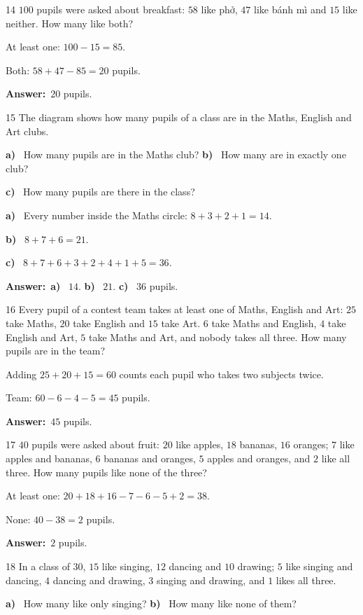 \documentclass[11pt]{article}
\newif\ifsol \solfalse
\providecommand{\AnsWord}{Đáp số}
\newcommand{\dapso}[1]{\par\textbf{\AnsWord:}\ #1}
\newcommand{\probsol}[1]{%
  \begin{lrbox}{\solmeasure}\begin{minipage}{\dimexpr\linewidth-24pt\relax}#1\end{minipage}\end{lrbox}%
  \ifsol
    \begin{solbox}#1\end{solbox}%
  \else
    \setlength{\solht}{\dimexpr\ht\solmeasure+\dp\solmeasure+0.85cm\relax}%
    \ifdim\solht<1.35cm\setlength{\solht}{1.35cm}\fi
    \begin{tcolorbox}[colback=white,colframe=Line,boxrule=0.8pt,arc=5pt,
      left=8pt,right=8pt,top=4pt,bottom=4pt,height=\solht]{\footnotesize\color{Slate}\itshape\WorkWord}\end{tcolorbox}%
  \fi}
\newcommand{\pa}[1]{\textbf{#1)}\ }
\newcommand{\gap}{\vspace{0.3cm}}
\def\WorkWord{Your work:}
\def\AnsWord{Answer}
\begin{document}
\gap
\begin{probbox}{14}{\relax}
$100$ pupils were asked about breakfast: $58$ like phở, $47$ like bánh mì and $15$ like neither. How many like both?
\end{probbox}
\probsol{
At least one: $100-15=85$.\par Both: $58+47-85=20$ pupils.
\dapso{$20$ pupils.}}
\gap
\needspace{7.5cm}
\begin{probbox}{15}{\relax}
The diagram shows how many pupils of a class are in the Maths, English and Art clubs.
\begin{center}
\end{center}
\pa{a} How many pupils are in the Maths club? \quad \pa{b} How many are in exactly one club?\par
\pa{c} How many pupils are there in the class?
\end{probbox}
\probsol{
\pa{a} Every number inside the Maths circle: $8+3+2+1=14$.\par
\pa{b} $8+7+6=21$.\par
\pa{c} $8+7+6+3+2+4+1+5=36$.
\dapso{\pa{a} $14$. \pa{b} $21$. \pa{c} $36$ pupils.}}
\gap
\begin{probbox}{16}{\relax}
Every pupil of a contest team takes at least one of Maths, English and Art: $25$ take Maths, $20$ take English and $15$ take Art. $6$ take Maths and English, $4$ take English and Art, $5$ take Maths and Art, and nobody takes all three. How many pupils are in the team?
\end{probbox}
\probsol{
Adding $25+20+15=60$ counts each pupil who takes two subjects twice.\par
Team: $60-6-4-5=45$ pupils.
\dapso{$45$ pupils.}}
\gap
\begin{probbox}{17}{\relax}
$40$ pupils were asked about fruit: $20$ like apples, $18$ bananas, $16$ oranges; $7$ like apples and bananas, $6$ bananas and oranges, $5$ apples and oranges, and $2$ like all three. How many pupils like none of the three?
\end{probbox}
\probsol{
At least one: $20+18+16-7-6-5+2=38$.\par None: $40-38=2$ pupils.
\dapso{$2$ pupils.}}
\gap
\begin{probbox}{18}{\relax}
In a class of $30$, $15$ like singing, $12$ dancing and $10$ drawing; $5$ like singing and dancing, $4$ dancing and drawing, $3$ singing and drawing, and $1$ likes all three.\par
\pa{a} How many like only singing? \quad \pa{b} How many like none of them?
\end{probbox}
\end{document}

